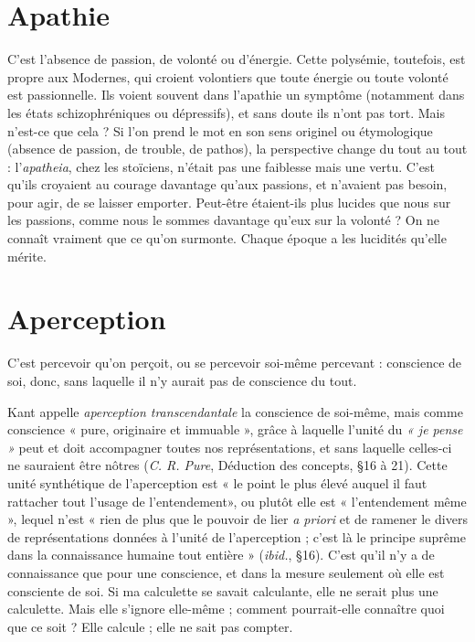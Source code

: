 \section{Apathie}
C'est l'absence de passion, de volonté ou d’énergie. Cette polysémie,
toutefois, est propre aux Modernes, qui croient volontiers
que toute énergie ou toute volonté est passionnelle. Ils voient souvent dans
l’apathie un symptôme (notamment dans les états schizophréniques ou dépressifs),
et sans doute ils n’ont pas tort. Mais n’est-ce que cela ? Si l’on prend le
mot en son sens originel ou étymologique (absence de passion, de trouble, de
pathos), la perspective change du tout au tout : l’{\it apatheia}, chez les stoïciens,
n'était pas une faiblesse mais une vertu. C’est qu’ils croyaient au courage
davantage qu'aux passions, et n’avaient pas besoin, pour agir, de se laisser
emporter. Peut-être étaient-ils plus lucides que nous sur les passions, comme
nous le sommes davantage qu’eux sur la volonté ? On ne connaît vraiment que
ce qu'on surmonte. Chaque époque a les lucidités qu’elle mérite.

\section{Aperception}
C'est percevoir qu’on perçoit, ou se percevoir soi-même
percevant : conscience de soi, donc, sans laquelle il n’y
aurait pas de conscience du tout.

Kant appelle {\it aperception transcendantale} la conscience de soi-même, mais
comme conscience « pure, originaire et immuable », grâce à laquelle l'unité du
{\it « je pense »} peut et doit accompagner toutes nos représentations, et sans laquelle
celles-ci ne sauraient être nôtres ({\it C. R. Pure}, Déduction des concepts, \S 16 à
21). Cette unité synthétique de l’aperception est « le point le plus élevé auquel
il faut rattacher tout l’usage de l’entendement», ou plutôt elle est
« l’entendement même », lequel n’est « rien de plus que le pouvoir de lier {\it a
priori} et de ramener le divers de représentations données à l’unité de
l’aperception ; c’est là le principe suprême dans la connaissance humaine tout
entière » ({\it ibid.}, \S 16). C’est qu’il n’y a de connaissance que pour une conscience,
et dans la mesure seulement où elle est consciente de soi. Si ma calculette
se savait calculante, elle ne serait plus une calculette. Mais elle s’ignore
elle-même ; comment pourrait-elle connaître quoi que ce soit ? Elle calcule ;
elle ne sait pas compter.


